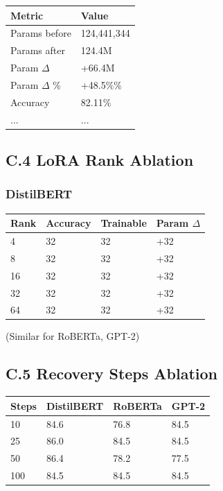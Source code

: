 \begin{table}[H]
\centering
\small
\begin{tabular}{ll}
\toprule
\textbf{Metric} & \textbf{Value} \\
\midrule
Params before & 124,441,344 \\
Params after & 124.4M \\
Param $\Delta$ & +66.4M \\
Param $\Delta$ \% & +48.5\%\% \\
Accuracy & 82.11\% \\
... & ... \\
\bottomrule
\end{tabular}
\end{table}

\subsection{C.4 LoRA Rank Ablation}

\subsubsection{DistilBERT}

\begin{table}[H]
\centering
\small
\begin{tabular}{llll}
\toprule
\textbf{Rank} & \textbf{Accuracy} & \textbf{Trainable} & \textbf{Param $\Delta$} \\
\midrule
4 & 32 & 32 & +32 \\
8 & 32 & 32 & +32 \\
16 & 32 & 32 & +32 \\
32 & 32 & 32 & +32 \\
64 & 32 & 32 & +32 \\
\bottomrule
\end{tabular}
\end{table}

(Similar for RoBERTa, GPT-2)

\subsection{C.5 Recovery Steps Ablation}

\begin{table}[H]
\centering
\small
\begin{tabular}{llll}
\toprule
\textbf{Steps} & \textbf{DistilBERT} & \textbf{RoBERTa} & \textbf{GPT-2} \\
\midrule
10 & 84.6 & 76.8 & 84.5 \\
25 & 86.0 & 84.5 & 84.5 \\
50 & 86.4 & 78.2 & 77.5 \\
100 & 84.5 & 84.5 & 84.5 \\
\bottomrule
\end{tabular}
\end{table}

